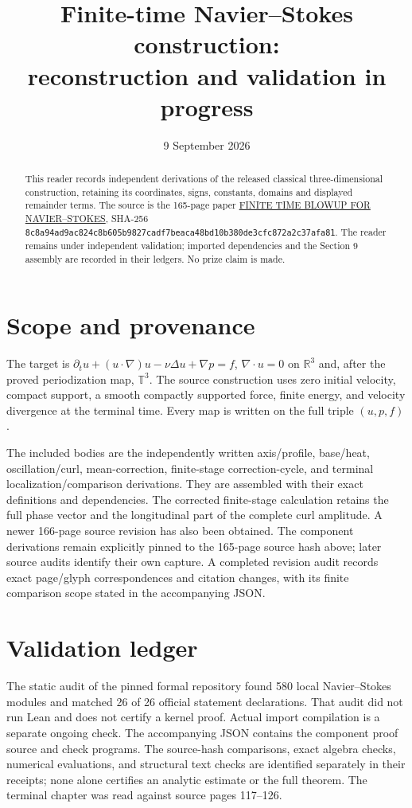 \documentclass[10pt,a4paper]{article}
\title{Finite-time Navier--Stokes construction:\\reconstruction and validation in progress}
\author{}\date{9 September 2026}
\newcounter{none}
\begin{document}
\maketitle
\begin{abstract}
This reader records independent derivations of the released classical three-dimensional construction, retaining its coordinates, signs, constants, domains and displayed remainder terms. The source is the 165-page paper \href{https://cdn.openai.com/pdf/32d9f210-8b73-45e0-91bc-82a30aef8a9a/navier-stokes.pdf}{FINITE TIME BLOWUP FOR NAVIER--STOKES}, SHA-256 \texttt{8c8a94ad9ac824c8b605b9827cadf7beaca48bd10b380de3cfc872a2c37afa81}. The reader remains under independent validation; imported dependencies and the Section 9 assembly are recorded in their ledgers. No prize claim is made.
\end{abstract}\tableofcontents
\section{Scope and provenance}
The target is $\partial_tu+(u\cdot\nabla)u-\nu\Delta u+\nabla p=f$, $\nabla\cdot u=0$ on $\mathbb R^3$ and, after the proved periodization map, $\mathbb T^3$. The source construction uses zero initial velocity, compact support, a smooth compactly supported force, finite energy, and velocity divergence at the terminal time. Every map is written on the full triple $(u,p,f)$.

The included bodies are the independently written axis/profile, base/heat, oscillation/curl, mean-correction, finite-stage correction-cycle, and terminal localization/comparison derivations. They are assembled with their exact definitions and dependencies. The corrected finite-stage calculation retains the full phase vector and the longitudinal part of the complete curl amplitude. A newer 166-page source revision has also been obtained. The component derivations remain explicitly pinned to the 165-page source hash above; later source audits identify their own capture. A completed revision audit records exact page/glyph correspondences and citation changes, with its finite comparison scope stated in the accompanying JSON.
\section{Validation ledger}
The static audit of the pinned formal repository found 580 local Navier--Stokes modules and matched 26 of 26 official statement declarations. That audit did not run Lean and does not certify a kernel proof. Actual import compilation is a separate ongoing check. The accompanying JSON contains the component proof source and check programs. The source-hash comparisons, exact algebra checks, numerical evaluations, and structural text checks are identified separately in their receipts; none alone certifies an analytic estimate or the full theorem. The terminal chapter was read against source pages 117--126.
\end{document}
